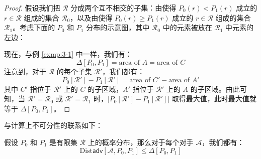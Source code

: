 \begin{proof}
假设我们把 $\mathcal{R}$ 分成两个互不相交的子集：由使得 $P_0(r)<P_1(r)$ 成立的 $r\in\mathcal R$ 组成的集合 $\mathcal{R}_0$，以及由使得 $P_0(r)\geq P_1(r)$ 成立的 $r\in\mathcal R$ 组成的集合 $\mathcal{R}_1$。考虑下面的 $P_0$ 和 $P_1$ 分布的示意图，其中 $\mathcal{R}_0$ 中的元素被放在 $\mathcal{R}_1$ 中元素的左边：

\begin{figure*}[h!]
  \centering
  
\end{figure*}

现在，与例 \ref{exmp:3-1} 中一样，我们有：
\[
\Delta[P_0,P_1]=\text{area of } A = \text{area of } C
\]
注意到，对于 $\mathcal{R}$ 的每个子集 $\mathcal{R}'$，我们都有：
\[
P_0[\mathcal{R}']-P_1[\mathcal{R}']=\text{area of } C' - \text{area of } A'
\]
其中 $C'$ 指位于 $\mathcal{R}'$ 上的 $C$ 的子区域，$A'$ 指位于 $\mathcal{R}'$ 上的 $A$ 的子区域。由此可知，当 $\mathcal{R}'=\mathcal{R}_0$ 或 $\mathcal{R}'=\mathcal{R}_1$ 时，$\big\lvert P_0[\mathcal{R}']-P_1[\mathcal{R}']\big\rvert$ 取得最大值，此时最大值就等于 $\Delta[P_0,P_1]$。
\end{proof}

与计算上不可分性的联系如下：

\begin{theorem}\label{theo:3-11}
假设 $P_0$ 和 $P_1$ 是有限集 $\mathcal{R}$ 上的概率分布，那么对于每个对手 $\mathcal A$，我们都有：
\[
\mathrm{Dist}\mathsf{adv}[\mathcal{A},P_0,P_1]
\leq\Delta[P_0,P_1]
\]
\end{theorem}

